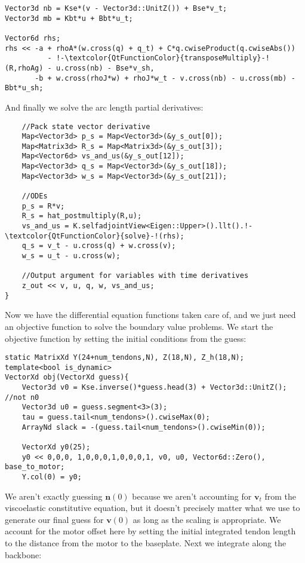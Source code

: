 \documentclass[12pt]{article}
\begin{document}
\begin{lstlisting}
Vector3d nb = Kse*(v - Vector3d::UnitZ()) + Bse*v_t;
Vector3d mb = Kbt*u + Bbt*u_t;

Vector6d rhs;
rhs << -a + rhoA*(w.cross(q) + q_t) + C*q.cwiseProduct(q.cwiseAbs())
          - !-\textcolor{QtFunctionColor}{transposeMultiply}-!(R,rhoAg) - u.cross(nb) - Bse*v_sh,
       -b + w.cross(rhoJ*w) + rhoJ*w_t - v.cross(nb) - u.cross(mb) - Bbt*u_sh;
\end{lstlisting}
And finally we solve the arc length partial derivatives:
\begin{lstlisting}
    //Pack state vector derivative
    Map<Vector3d> p_s = Map<Vector3d>(&y_s_out[0]);
    Map<Matrix3d> R_s = Map<Matrix3d>(&y_s_out[3]);
    Map<Vector6d> vs_and_us(&y_s_out[12]);
    Map<Vector3d> q_s = Map<Vector3d>(&y_s_out[18]);
    Map<Vector3d> w_s = Map<Vector3d>(&y_s_out[21]);

    //ODEs
    p_s = R*v;
    R_s = hat_postmultiply(R,u);
    vs_and_us = K.selfadjointView<Eigen::Upper>().llt().!-\textcolor{QtFunctionColor}{solve}-!(rhs);
    q_s = v_t - u.cross(q) + w.cross(v);
    w_s = u_t - u.cross(w);

    //Output argument for variables with time derivatives
    z_out << v, u, q, w, vs_and_us;
}
\end{lstlisting}
Now we have the differential equation functions taken care of, and we just need an objective function to solve the boundary value problems. We start the objective function by setting the initial conditions from the guess:
\begin{lstlisting}
static MatrixXd Y(24+num_tendons,N), Z(18,N), Z_h(18,N);
template<bool is_dynamic>
VectorXd obj(VectorXd guess){
    Vector3d v0 = Kse.inverse()*guess.head(3) + Vector3d::UnitZ(); //not n0
    Vector3d u0 = guess.segment<3>(3);
    tau = guess.tail<num_tendons>().cwiseMax(0);
    ArrayNd slack = -(guess.tail<num_tendons>().cwiseMin(0));

    VectorXd y0(25);
    y0 << 0,0,0, 1,0,0,0,1,0,0,0,1, v0, u0, Vector6d::Zero(), base_to_motor;
    Y.col(0) = y0;
\end{lstlisting}
We aren't exactly guessing $\boldsymbol{n}(0)$ because we aren't accounting for $\boldsymbol{v}_t$ from the viscoelastic constitutive equation, but it doesn't precisely matter what we use to generate our final guess for $\boldsymbol{v}(0)$ as long as the scaling is appropriate. We account for the motor offset here by setting the initial integrated tendon length to the distance from the motor to the baseplate. Next we integrate along the backbone:
\end{document}
